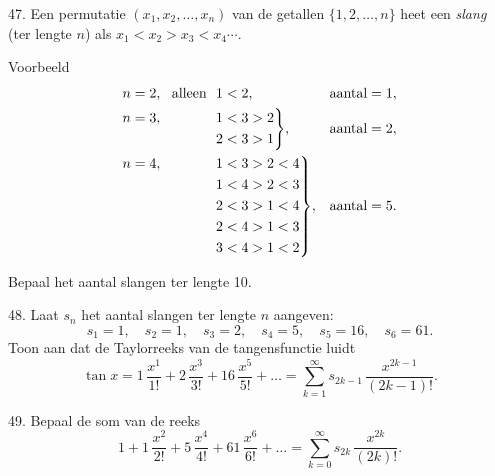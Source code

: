 \clearpage

\begin{problem}{47.}
	Een permutatie $(x_1,x_2,\dotsc,x_n)$ van de getallen $\{1,2,\dotsc,n\}$ heet een \emph{slang} (ter lengte $n$) als $x_1<x_2>x_3<x_4 \dotsb$.
\\
	\begin{note}{Voorbeeld}
		\begin{equation*}
			\begin{aligned}[t]
				&\begin{aligned}[t] n=2, \text{\ \ alleen\ \ } 1<2, \end{aligned} &&\text{aantal} = 1, \\
				&\hskip-\nulldelimiterspace\mathord{\left.\begin{aligned} n=3, \hphantom{\text{\ \ alleen\ \ }} 1&<3>2 \\
				2&<3>1\end{aligned} \right\}}, && \text{aantal} = 2, \\
				&\hskip-\nulldelimiterspace\mathord{\left.\begin{aligned} n=4, \hphantom{\text{\ \ alleen\ \ }} 1&<3>2<4 \\
				1&<4>2<3 \\
				2&<3>1<4 \\
				2&<4>1<3 \\
				3&<4>1<2\end{aligned} \right\}},
				&&\text{aantal} = 5. \\
			\end{aligned}
		\end{equation*}
	\end{note}
	Bepaal het aantal slangen ter lengte 10.
\end{problem}

\begin{problem}{48.}
	Laat $s_n$ het aantal slangen ter lengte $n$ aangeven:
	\begin{equation*}
		s_1=1, \quad s_2=1, \quad s_3=2, \quad s_4=5, \quad s_5=16, \quad s_6=61.
	\end{equation*}
	Toon aan dat de Taylorreeks van de tangensfunctie luidt
	\begin{equation*}
		\tan x=1\, \frac{x^1}{1!}+2\, \frac{x^3}{3!}+16\, \frac{x^5}{5!}+\dots=
		\textstyle\sum\limits_{k=1}^{\infty} s_{2k-1}\, \frac{x^{2k-1}}{(2k-1)!}.
	\end{equation*}
\end{problem}

\begin{problem}{49.}
	Bepaal de som van de reeks
	\begin{equation*}
		1+1\, \frac{x^2}{2!}+5\, \frac{x^4}{4!}+61\, \frac{x^6}{6!}+\dots=
		\textstyle\sum\limits_{k=0}^{\infty} s_{2k}\, \frac{x^{2k}}{(2k)!}.
	\end{equation*}
\end{problem}

